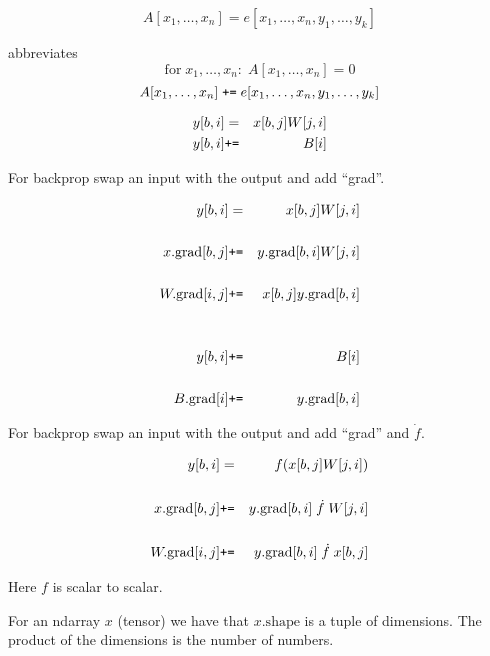 {\vfill
\vfill
$$A[x_1,\ldots,x_n] = e[x_1,\ldots,x_n,y_1,\ldots,y_k]$$

abbreviates
$$\mbox{for}\;x_1,\ldots,x_n: \;A[x_1,\ldots,x_n] = 0$$
$$A[x_1,\ldots,x_n] \; \mbox{\tt +=}\; e[x_1,\ldots,x_n,y_1,\ldots,y_k]$$


\begin{eqnarray*}
  y[b,i] & = & x[b,j]W[j,i] \\
  y[b,i] & \mbox{\tt +=} & B[i]
\end{eqnarray*}


For backprop swap an input with the output and add ``grad''.

\begin{eqnarray*}
  y[b,i] & = & x[b,j]W[j,i] \\
  \\
  x.\mathrm{grad}[b,j] & \mbox{\tt +=} & y.\mathrm{grad}[b,i]W[j,i] \\
  \\
  W.\mathrm{grad}[i,j] & \mbox{\tt +=} & x[b,j] y.\mathrm{grad}[b,i] \\
  \\
  \\
  y[b,i] & \mbox{\tt +=} & B[i] \\
  \\
  B.\mathrm{grad}[i] & \mbox{\tt +=} & y.\mathrm{grad}[b,i]
\end{eqnarray*}


For backprop swap an input with the output and add ``grad'' and $\dot{f}$.

\begin{eqnarray*}
  y[b,i] & = & f(x[b,j]W[j,i]) \\
  \\
  x.\mathrm{grad}[b,j] & \mbox{\tt +=} & y.\mathrm{grad}[b,i]\;\dot{f}\;W[j,i] \\
  \\
  W.\mathrm{grad}[i,j] & \mbox{\tt +=} & y.\mathrm{grad}[b,i]\;\dot{f}\;x[b,j]
\end{eqnarray*}

\vfill
Here $f$ is scalar to scalar.


For an ndarray $x$ (tensor) we have that $x.\mathrm{shape}$ is a tuple of dimensions.  The product of the dimensions is the number of numbers.

}
